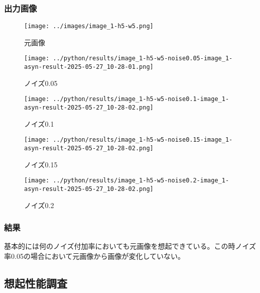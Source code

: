 \documentclass{ltjsarticle}
\begin{document}
\subsubsection{出力画像}
\begin{figure}[h]
  \centering
  \begin{minipage}[b]{0.18\columnwidth}
      \centering
      \texttt{[image: ../images/image\_1-h5-w5.png]}
      \caption{元画像}
  \end{minipage}
  \begin{minipage}[b]{0.18\columnwidth}
      \centering
      \texttt{[image: ../python/results/image\_1-h5-w5-noise0.05-image\_1-asyn-result-2025-05-27\_10-28-01.png]}
      \caption{ノイズ0.05}
  \end{minipage}
  \begin{minipage}[b]{0.18\columnwidth}
      \centering
      \texttt{[image: ../python/results/image\_1-h5-w5-noise0.1-image\_1-asyn-result-2025-05-27\_10-28-02.png]}
      \caption{ノイズ0.1}
  \end{minipage}
  \begin{minipage}[b]{0.18\columnwidth}
      \centering
      \texttt{[image: ../python/results/image\_1-h5-w5-noise0.15-image\_1-asyn-result-2025-05-27\_10-28-02.png]}
      \caption{ノイズ0.15}
  \end{minipage}
  \begin{minipage}[b]{0.18\columnwidth}
      \centering
      \texttt{[image: ../python/results/image\_1-h5-w5-noise0.2-image\_1-asyn-result-2025-05-27\_10-28-02.png]}
      \caption{ノイズ0.2}
  \end{minipage}
\end{figure}
\subsubsection{結果}
基本的には何のノイズ付加率においても元画像を想起できている。この時ノイズ率0.05の場合において元画像から画像が変化していない。
\newpage
\subsection{想起性能調査}
\end{document}
